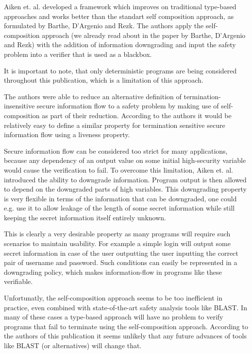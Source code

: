\documentclass[a4paper,UKenglish]{lipics-v2018}
\begin{document}
Aiken et. al. developed a framework which improves on traditional type-based approaches and works better than the standart self composition approach, as formulated by Barthe, D'Argenio and Rezk.\cite{information_flow_by_self_composition}
The authors apply the self-composition approach (we already read about in the paper by Barthe, D'Argenio and Rezk) with the addition of information downgrading and input the safety problem into a verifier that is used as a blackbox.\cite{secure_information_flow_safety}

It is important to note, that only deterministic programs are being considered throughout this publication, which is a limitation of this approach.

The authors were able to reduce an alternative definition of termination-insensitive secure information flow to a safety problem by making use of self-composition as part of their reduction. According to the authors it would be relatively easy to define a similar property for termination sensitive secure information flow using a liveness property.\cite{secure_information_flow_safety}

Secure information flow can be considered too strict for many applications, because any dependency of an output value on some initial high-security variable would cause the verification to fail. To overcome this limitation, Aiken et. al. introduced the ability to downgrade information. Program output is then allowed to depend on the downgraded parts of high variables. This downgrading property is very flexible in terms of the information that can be downgraded, one could e.g. use it to allow leakage of the length of some secret information while still keeping the secret information itself entirely unknown.\cite{secure_information_flow_safety}

This is clearly a very desirable property as many programs will require such scenarios to maintain usability. For example a simple login will output some secret information in case of the user outputting the user inputting the correct pair of username and password. Such conditions can easily be represented in a downgrading policy, which makes information-flow in programs like these verifiable.\cite{secure_information_flow_safety}

Unfortunatly, the self-composition approach seems to be too inefficient in practice, even combined with state-of-the-art safety analysis tools like BLAST. In many of these cases a type-based approach will have no problem to verify programs that fail to terminate using the self-composition approach. According to the authors of this publication it seems unlikely that any future advances of tools like BLAST (or alternatives) will change that.\cite{secure_information_flow_safety}
\end{document}
